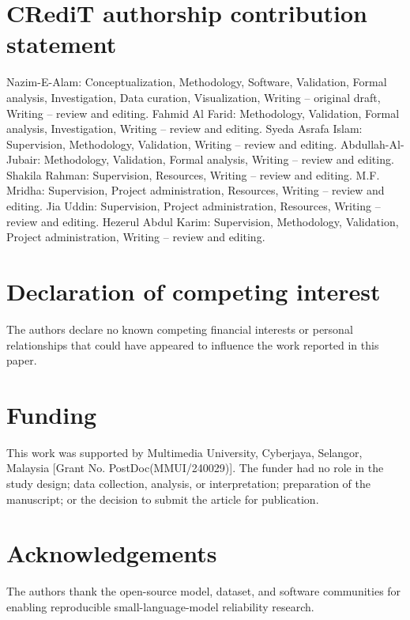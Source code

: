 \documentclass[preprint,12pt,authoryear]{elsarticle}
\begin{document}
\FloatBarrier
\section*{CRediT authorship contribution statement}
Nazim-E-Alam: Conceptualization, Methodology, Software, Validation, Formal analysis, Investigation, Data curation, Visualization, Writing -- original draft, Writing -- review and editing. Fahmid Al Farid: Methodology, Validation, Formal analysis, Investigation, Writing -- review and editing. Syeda Asrafa Islam: Supervision, Methodology, Validation, Writing -- review and editing. Abdullah-Al-Jubair: Methodology, Validation, Formal analysis, Writing -- review and editing. Shakila Rahman: Supervision, Resources, Writing -- review and editing. M.F. Mridha: Supervision, Project administration, Resources, Writing -- review and editing. Jia Uddin: Supervision, Project administration, Resources, Writing -- review and editing. Hezerul Abdul Karim: Supervision, Methodology, Validation, Project administration, Writing -- review and editing.

\section*{Declaration of competing interest}
The authors declare no known competing financial interests or personal relationships that could have appeared to influence the work reported in this paper.

\section*{Funding}
This work was supported by Multimedia University, Cyberjaya, Selangor, Malaysia [Grant No. PostDoc(MMUI/240029)]. The funder had no role in the study design; data collection, analysis, or interpretation; preparation of the manuscript; or the decision to submit the article for publication.

\section*{Acknowledgements}
The authors thank the open-source model, dataset, and software communities for enabling reproducible small-language-model reliability research.
\end{document}
